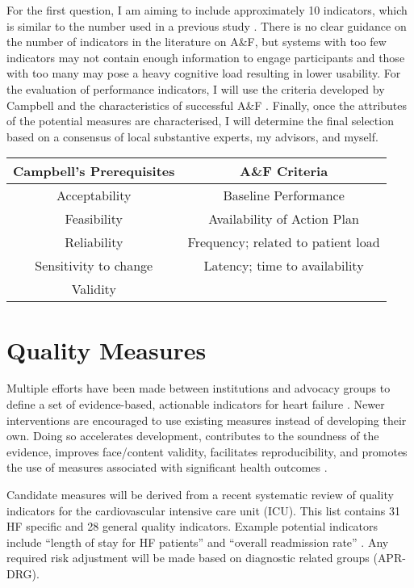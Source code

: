 For the first question, I am aiming to include approximately 10 indicators, which is similar to the number used in a previous study \cite{matthews2007impact}. There is no clear guidance on the number of indicators in the literature on A\&F, but systems with too few indicators may not contain enough information to engage participants and those with too many may pose a heavy cognitive load resulting in lower usability. For the evaluation of performance indicators, I will use the criteria developed by Campbell  \cite{campbell2002research} and the characteristics of successful A\&F \cite{ivers2012audit}. Finally, once the attributes of the potential measures are characterised, I will determine the final selection based on a consensus of local substantive experts, my advisors, and myself.

\begin{center}
    \begin{tabular}{ c|c }
         \textbf{Campbell's Prerequisites} & \textbf{A\&F Criteria}  \\ 
         \hline
         Acceptability         & Baseline Performance  \\  
         Feasibility           & Availability of Action Plan \\
         Reliability           & Frequency; related to patient load \\
         Sensitivity to change & Latency; time to availability \\
         Validity              &  \\
    \end{tabular}
\end{center}

\section{Quality Measures}
Multiple efforts have been made between institutions and advocacy groups to define a set of evidence-based, actionable indicators for heart failure \cite{hong2006overview, fonarow2010improving, kelley2006health}. Newer interventions are encouraged to use existing measures instead of developing their own. Doing so accelerates development, contributes to the soundness of the evidence, improves face/content validity, facilitates reproducibility, and promotes the use of measures associated with significant health outcomes \cite{smith2009performance}.

Candidate measures will be derived from a recent systematic review of quality indicators for the cardiovascular intensive care unit (\gls{ICU}). This list contains 31 \gls{HF} specific and 28 general quality indicators. Example potential indicators include ``length of stay for HF patients'' and ``overall readmission rate'' \cite{goldfarb2018systematic}. Any required risk adjustment will be made based on diagnostic related groups (\gls{APR-DRG}).

